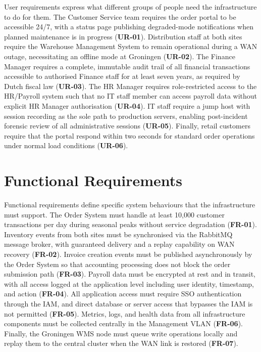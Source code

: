 \label{tab:req-user}User requirements express what different groups of people need the infrastructure to do for them. The Customer Service team requires the order portal to be accessible 24/7, with a status page publishing degraded-mode notifications when planned maintenance is in progress (\textbf{UR-01}). Distribution staff at both sites require the Warehouse Management System to remain operational during a WAN outage, necessitating an offline mode at Groningen (\textbf{UR-02}). The Finance Manager requires a complete, immutable audit trail of all financial transactions accessible to authorised Finance staff for at least seven years, as required by Dutch fiscal law (\textbf{UR-03}). The HR Manager requires role-restricted access to the HR/Payroll system such that no IT staff member can access payroll data without explicit HR Manager authorisation (\textbf{UR-04}). IT staff require a jump host with session recording as the sole path to production servers, enabling post-incident forensic review of all administrative sessions (\textbf{UR-05}). Finally, retail customers require that the portal respond within two seconds for standard order operations under normal load conditions (\textbf{UR-06}).

\section{Functional Requirements}

\label{tab:req-functional}Functional requirements define specific system behaviours that the infrastructure must support. The Order System must handle at least 10,000 customer transactions per day during seasonal peaks without service degradation (\textbf{FR-01}). Inventory events from both sites must be synchronised via the RabbitMQ message broker, with guaranteed delivery and a replay capability on WAN recovery (\textbf{FR-02}). Invoice creation events must be published asynchronously by the Order System so that accounting processing does not block the order submission path (\textbf{FR-03}). Payroll data must be encrypted at rest and in transit, with all access logged at the application level including user identity, timestamp, and action (\textbf{FR-04}). All application access must require SSO authentication through the IAM, and direct database or server access that bypasses the IAM is not permitted (\textbf{FR-05}). Metrics, logs, and health data from all infrastructure components must be collected centrally in the Management VLAN (\textbf{FR-06}). Finally, the Groningen WMS node must queue write operations locally and replay them to the central cluster when the WAN link is restored (\textbf{FR-07}).

